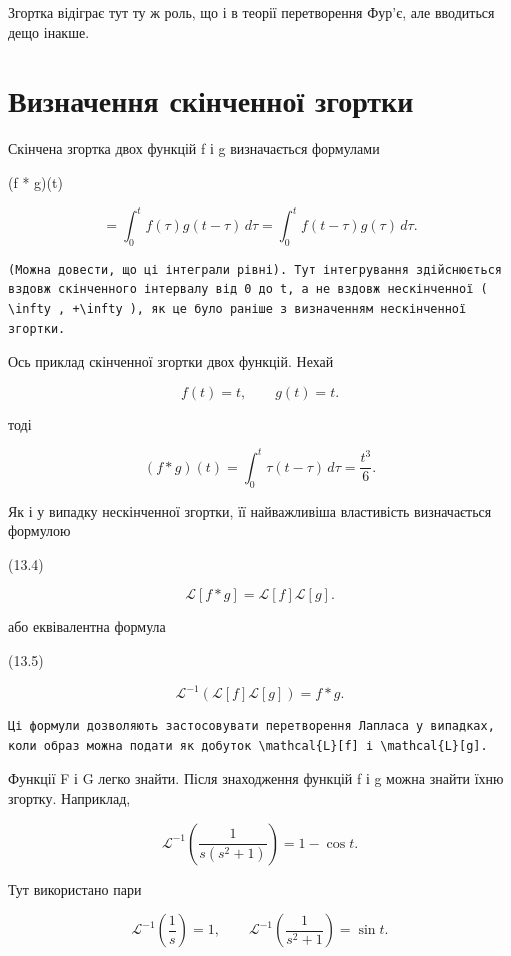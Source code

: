 \documentclass[
  ukrainian,
]{article}
\begin{document}
Згортка відіграє тут ту ж роль, що і в теорії перетворення Фур'є, але
вводиться дещо інакше.

\section{Визначення скінченної
згортки}\label{ux432ux438ux437ux43dux430ux447ux435ux43dux43dux44f-ux441ux43aux456ux43dux447ux435ux43dux43dux43eux457-ux437ux433ux43eux440ux442ux43aux438}

Скінчена згортка двох функцій f і g визначається формулами

(f * g)(t)

\[
= \int_0^t f(\tau)g(t-\tau)\,d\tau
= \int_0^t f(t-\tau)g(\tau)\,d\tau.
\]

\begin{verbatim}
(Можна довести, що ці інтеграли рівні). Тут інтегрування здійснюється вздовж скінченного інтервалу від 0 до t, а не вздовж нескінченної ( \infty , +\infty ), як це було раніше з визначенням нескінченної згортки.
\end{verbatim}

Ось приклад скінченної згортки двох функцій. Нехай

\[
f(t)=t,\qquad g(t)=t.
\]

тоді

\[
(f * g)(t)=\int_0^t \tau(t-\tau)\,d\tau=\frac{t^3}{6}.
\]

Як і у випадку нескінченної згортки, її найважливіша властивість
визначається формулою

(13.4)

\[
\mathcal{L}[f*g]=\mathcal{L}[f]\mathcal{L}[g].
\]

або еквівалентна формула

(13.5)

\[
\mathcal{L}^{-1}\!\left(\mathcal{L}[f]\mathcal{L}[g]\right)=f*g.
\]

\begin{verbatim}
Ці формули дозволяють застосовувати перетворення Лапласа у випадках, коли образ можна подати як добуток \mathcal{L}[f] і \mathcal{L}[g].
\end{verbatim}

Функції F і G легко знайти. Після знаходження функцій f і g можна знайти
їхню згортку. Наприклад,

\[
\mathcal{L}^{-1}\!\left(\frac{1}{s(s^2+1)}\right)=1-\cos t.
\]

Тут використано пари

\[
\mathcal{L}^{-1}\!\left(\frac{1}{s}\right)=1,\qquad
\mathcal{L}^{-1}\!\left(\frac{1}{s^2+1}\right)=\sin t.
\]
\end{document}
